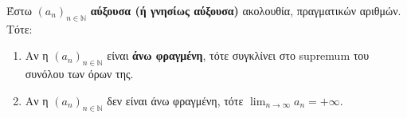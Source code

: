 \begin{mybox2}
  \begin{thm}
    \label{thm:aukssygk}
    Έστω $ {(a_{n})}_{n \in \mathbb{N}} $ \textbf{αύξουσα (ή γνησίως αύξουσα)} 
    ακολουθία, πραγματικών αριθμών. Τότε:
    \begin{enumerate}
      \item Αν η $ {(a_{n})}_{n \in \mathbb{N}} $ είναι \textbf{άνω φραγμένη}, 
        τότε συγκλίνει στο supremum του συνόλου των όρων της.
      \item Αν η $ {(a_{n})}_{n \in \mathbb{N}} $ δεν είναι άνω φραγμένη, τότε 
        $ \lim_{n \to \infty} a_{n}=+\infty $.
    \end{enumerate}
  \end{thm}
\end{mybox2}

